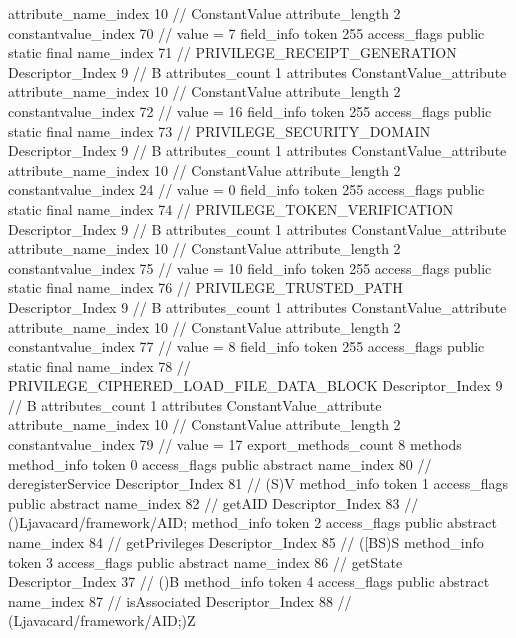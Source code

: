 {{{{{{{					attribute_name_index	10		// ConstantValue
					attribute_length	2
					constantvalue_index	70		// value = 7
				}
				}
			}
			field_info {
				token	255
				access_flags	public static final
				name_index	71		// PRIVILEGE_RECEIPT_GENERATION
				Descriptor_Index	9		// B
				attributes_count	1
				attributes {
				ConstantValue_attribute {
					attribute_name_index	10		// ConstantValue
					attribute_length	2
					constantvalue_index	72		// value = 16
				}
				}
			}
			field_info {
				token	255
				access_flags	public static final
				name_index	73		// PRIVILEGE_SECURITY_DOMAIN
				Descriptor_Index	9		// B
				attributes_count	1
				attributes {
				ConstantValue_attribute {
					attribute_name_index	10		// ConstantValue
					attribute_length	2
					constantvalue_index	24		// value = 0
				}
				}
			}
			field_info {
				token	255
				access_flags	public static final
				name_index	74		// PRIVILEGE_TOKEN_VERIFICATION
				Descriptor_Index	9		// B
				attributes_count	1
				attributes {
				ConstantValue_attribute {
					attribute_name_index	10		// ConstantValue
					attribute_length	2
					constantvalue_index	75		// value = 10
				}
				}
			}
			field_info {
				token	255
				access_flags	public static final
				name_index	76		// PRIVILEGE_TRUSTED_PATH
				Descriptor_Index	9		// B
				attributes_count	1
				attributes {
				ConstantValue_attribute {
					attribute_name_index	10		// ConstantValue
					attribute_length	2
					constantvalue_index	77		// value = 8
				}
				}
			}
			field_info {
				token	255
				access_flags	public static final
				name_index	78		// PRIVILEGE_CIPHERED_LOAD_FILE_DATA_BLOCK
				Descriptor_Index	9		// B
				attributes_count	1
				attributes {
				ConstantValue_attribute {
					attribute_name_index	10		// ConstantValue
					attribute_length	2
					constantvalue_index	79		// value = 17
				}
				}
			}
			}
			export_methods_count	8
			methods {
				method_info {
					token	0
					access_flags	public abstract
					name_index	80		// deregisterService
					Descriptor_Index	81		// (S)V
				}
				method_info {
					token	1
					access_flags	public abstract
					name_index	82		// getAID
					Descriptor_Index	83		// ()Ljavacard/framework/AID;
				}
				method_info {
					token	2
					access_flags	public abstract
					name_index	84		// getPrivileges
					Descriptor_Index	85		// ([BS)S
				}
				method_info {
					token	3
					access_flags	public abstract
					name_index	86		// getState
					Descriptor_Index	37		// ()B
				}
				method_info {
					token	4
					access_flags	public abstract
					name_index	87		// isAssociated
					Descriptor_Index	88		// (Ljavacard/framework/AID;)Z
}}}}}
